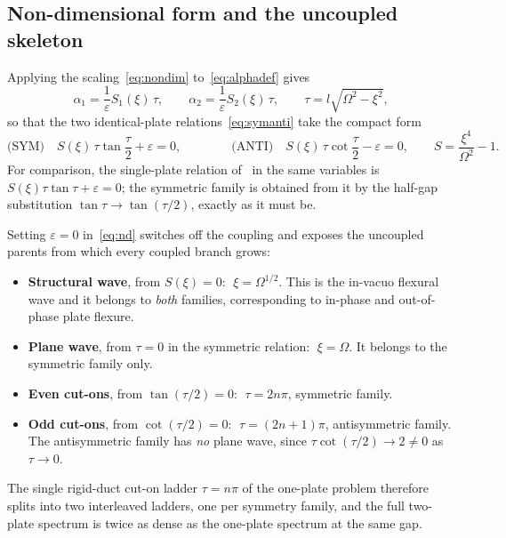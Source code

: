 \documentclass[11pt,a4paper]{article}
\newcommand{\Om}{\Omega}
\newcommand{\eps}{\varepsilon}
\theoremstyle{plain}
\theoremstyle{remark}
\begin{document}
\subsection{Non-dimensional form and the uncoupled skeleton}
Applying the scaling~\eqref{eq:nondim} to~\eqref{eq:alphadef} gives
\begin{equation}
\alpha_1=\frac{1}{\eps}S_1(\xi)\,\tau,\qquad
\alpha_2=\frac{1}{\eps}S_2(\xi)\,\tau,\qquad
\tau=l\sqrt{\Om^2-\xi^2},
\label{eq:alphand}
\end{equation}
so that the two identical-plate relations~\eqref{eq:symanti} take the compact form
\begin{equation}
\text{(SYM)}\quad S(\xi)\,\tau\tan\frac{\tau}{2}+\eps=0,
\qquad\qquad
\text{(ANTI)}\quad S(\xi)\,\tau\cot\frac{\tau}{2}-\eps=0,
\qquad S=\frac{\xi^4}{\Om^2}-1 .
\label{eq:nd}
\end{equation}
For comparison, the single-plate relation of~\cite{sarkarsonti} in the same variables is
$S(\xi)\tau\tan\tau+\eps=0$; the symmetric family is obtained from it by the half-gap substitution
$\tan\tau\to\tan(\tau/2)$, exactly as it must be.

Setting $\eps=0$ in~\eqref{eq:nd} switches off the coupling and exposes the uncoupled parents from
which every coupled branch grows:
\begin{itemize}[leftmargin=1.6em,itemsep=1pt]
\item \textbf{Structural wave}, from $S(\xi)=0$: $\;\xi=\Om^{1/2}$. This is the in-vacuo flexural wave
and it belongs to \emph{both} families, corresponding to in-phase and out-of-phase plate flexure.
\item \textbf{Plane wave}, from $\tau=0$ in the symmetric relation: $\;\xi=\Om$. It belongs to the
symmetric family only.
\item \textbf{Even cut-ons}, from $\tan(\tau/2)=0$: $\;\tau=2n\pi$, symmetric family.
\item \textbf{Odd cut-ons}, from $\cot(\tau/2)=0$: $\;\tau=(2n{+}1)\pi$, antisymmetric family. The
antisymmetric family has \emph{no} plane wave, since $\tau\cot(\tau/2)\to2\ne0$ as $\tau\to0$.
\end{itemize}
The single rigid-duct cut-on ladder $\tau=n\pi$ of the one-plate problem therefore splits into two
interleaved ladders, one per symmetry family, and the full two-plate spectrum is twice as dense as the
one-plate spectrum at the same gap.
\end{document}
